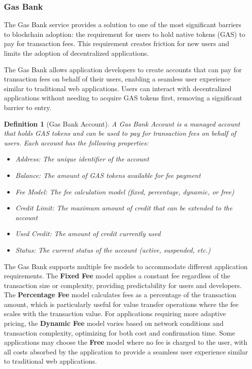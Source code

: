 \documentclass[12pt,a4paper]{article}
\newtheorem{definition}{Definition}
\begin{document}
\subsubsection{Gas Bank}
\label{subsubsec:gas-bank}

The Gas Bank service provides a solution to one of the most significant barriers to blockchain adoption: the requirement for users to hold native tokens (GAS) to pay for transaction fees. This requirement creates friction for new users and limits the adoption of decentralized applications.



The Gas Bank allows application developers to create accounts that can pay for transaction fees on behalf of their users, enabling a seamless user experience similar to traditional web applications. Users can interact with decentralized applications without needing to acquire GAS tokens first, removing a significant barrier to entry.

\begin{definition}[Gas Bank Account]
A Gas Bank Account is a managed account that holds GAS tokens and can be used to pay for transaction fees on behalf of users. Each account has the following properties:
\begin{itemize}
    \item Address: The unique identifier of the account
    \item Balance: The amount of GAS tokens available for fee payment
    \item Fee Model: The fee calculation model (fixed, percentage, dynamic, or free)
    \item Credit Limit: The maximum amount of credit that can be extended to the account
    \item Used Credit: The amount of credit currently used
    \item Status: The current status of the account (active, suspended, etc.)
\end{itemize}
\end{definition}

The Gas Bank supports multiple fee models to accommodate different application requirements. The \textbf{Fixed Fee} model applies a constant fee regardless of the transaction size or complexity, providing predictability for users and developers. The \textbf{Percentage Fee} model calculates fees as a percentage of the transaction amount, which is particularly useful for value transfer operations where the fee scales with the transaction value. For applications requiring more adaptive pricing, the \textbf{Dynamic Fee} model varies based on network conditions and transaction complexity, optimizing for both cost and confirmation time. Some applications may choose the \textbf{Free} model where no fee is charged to the user, with all costs absorbed by the application to provide a seamless user experience similar to traditional web applications.
\end{document}
